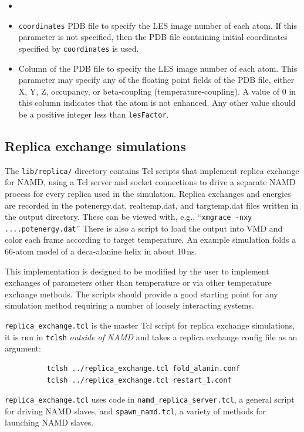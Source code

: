 \begin{itemize}
\item
\item
{} {{\tt coordinates}}
{PDB file to specify the LES image number of each atom.
If this parameter is not specified, then 
the PDB file containing initial coordinates specified by 
{\tt coordinates} is used.}

\item
{}
{Column of the PDB file to specify the LES image number of each atom.
This parameter may specify any of the floating point fields of the PDB file, 
either X, Y, Z, occupancy, or beta-coupling (temperature-coupling).  
A value of 0 in this column indicates that the atom is not enhanced.
Any other value should be a positive integer less than {\tt lesFactor}.}

\end{itemize}


\subsection{Replica exchange simulations}

The {\tt lib/replica/}
directory contains Tcl scripts that implement replica exchange
for NAMD, using a Tcl server and socket connections to drive a
separate NAMD process for every replica used in the simulation.
Replica exchanges and energies are recorded in the potenergy.dat,
realtemp.dat, and targtemp.dat files written in the output directory.
These can be viewed with, e.g., ``{\tt xmgrace -nxy ....potenergy.dat}''
There is also a script to load the output into VMD and color each
frame according to target temperature.  An example simulation folds
a 66-atom model of a deca-alanine helix in about 10\,ns.

This implementation is designed to be modified by the user to implement
exchanges of parameters other than temperature or via other temperature
exchange methods.  The scripts should provide a good starting point for
any simulation method requiring a number of loosely interacting systems.

{\tt replica\_exchange.tcl}
is the master Tcl script for replica exchange simulations, it is run in
{\tt tclsh} {\em outside of NAMD} and takes a replica exchange config
file as an argument:
\begin{verbatim}
          tclsh ../replica_exchange.tcl fold_alanin.conf
          tclsh ../replica_exchange.tcl restart_1.conf
\end{verbatim}
{\tt replica\_exchange.tcl} uses code in
{\tt namd\_replica\_server.tcl}, a general script for driving NAMD slaves, and
{\tt spawn\_namd.tcl}, a variety of methods for launching NAMD slaves.


